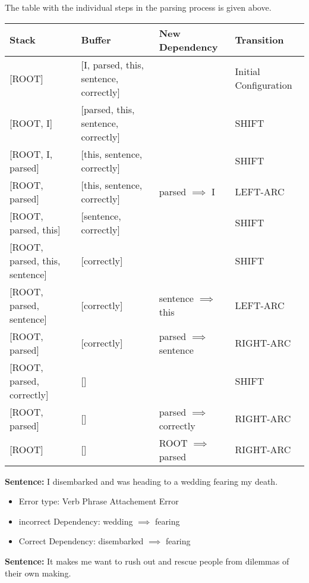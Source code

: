 \documentclass[a4]{article}
\begin{document}

The table with the individual steps in the parsing process is given above.


\begin{center}
\begin{table}
\begin{tabular}{l|l|l|l}
 Stack & Buffer & New Dependency & Transition \\ \hline
{[ROOT]} & {[I, parsed, this, sentence, correctly]} &  & Initial Configuration \\
{[ROOT, I]} & {[parsed, this, sentence, correctly]} &  & SHIFT \\
{[ROOT, I, parsed]} & {[this, sentence, correctly]} &  & SHIFT \\
{[ROOT, parsed]} & {[this, sentence, correctly]} & parsed $\implies$ I & LEFT-ARC \\
{[ROOT, parsed, this]} & {[sentence, correctly]} &  & SHIFT\\
{[ROOT, parsed, this, sentence]} & {[correctly]} &  & SHIFT\\
{[ROOT, parsed, sentence]} & {[correctly]} & sentence $\implies$ this & LEFT-ARC \\
{[ROOT, parsed]} & {[correctly]} & parsed $\implies$ sentence & RIGHT-ARC \\
{[ROOT, parsed, correctly]} & {[]} &  & SHIFT \\
{[ROOT, parsed]} & {[]} & parsed $\implies$ correctly & RIGHT-ARC \\
{[ROOT]} & {[]} & ROOT $\implies$ parsed & RIGHT-ARC 


\end{tabular}
\end{table}
\end{center}


\textbf{Sentence: }I disembarked and was heading to a wedding fearing my death.

\begin{itemize}
\item Error type: Verb Phrase Attachement Error
\item incorrect Dependency: wedding $\implies$ fearing
\item Correct Dependency: disembarked $\implies$ fearing
\end{itemize}

\textbf{Sentence: }It makes me want to rush out and rescue people from dilemmas of their own making.
\end{document}
